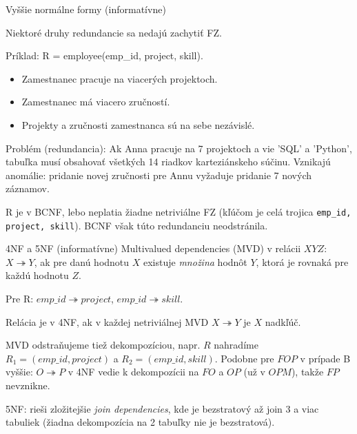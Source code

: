 \documentclass[12pt]{beamer}
\def\blue#1{\textcolor{Cerulean}{#1}}
\begin{document}
\begin{frame}[fragile]{Vyššie normálne formy (informatívne)}

Niektoré druhy redundancie sa nedajú zachytiť FZ.

Príklad: R = employee(emp\_id, project, skill).
\begin{itemize}
    \item Zamestnanec pracuje na viacerých projektoch.
    \item Zamestnanec má viacero zručností.
    \item Projekty a zručnosti zamestnanca \alert{sú na sebe nezávislé}.
\end{itemize}

Problém (redundancia): Ak Anna pracuje na 7 projektoch a vie 'SQL' a 'Python', tabuľka \alert{musí} obsahovať všetkých 14 riadkov karteziánskeho súčinu.
Vznikajú anomálie: pridanie novej zručnosti pre Annu vyžaduje pridanie 7 nových záznamov.

\medskip
R je v BCNF, lebo neplatia žiadne netriviálne FZ (kľúčom je celá trojica \texttt{emp\_id, project, skill}). BCNF však túto redundanciu neodstránila.
\end{frame}

\begin{frame}[fragile]{4NF a 5NF (informatívne)}
\alert{Multivalued dependencies} (MVD) v relácii $XYZ$:
$X \twoheadrightarrow Y$, ak pre danú hodnotu $X$ existuje \emph{množina} hodnôt $Y$, ktorá je rovnaká pre každú hodnotu $Z$.

Pre R:
$ emp\_id \twoheadrightarrow project$, $emp\_id \twoheadrightarrow skill$.

\bigskip
Relácia je v 4NF, ak v každej netriviálnej MVD $X \twoheadrightarrow Y$ je $X$ nadkľúč.

\bigskip
MVD odstraňujeme tiež dekompozíciou, napr. $R$ nahradíme $R_1 = (emp\_id, project)$ a $R_2 = (emp\_id, skill)$.
Podobne pre $FOP$ v \blue{prípade B} vyššie: $O \twoheadrightarrow P$ v 4NF vedie k dekompozícii na $FO$ a $OP$ (už v $OPM$), takže $FP$ nevznikne.
\bigskip

{\small \alert{5NF}: rieši zložitejšie \emph{join dependencies}, kde je bezstratový až join 3 a viac tabuliek (žiadna dekompozícia na 2 tabuľky nie je bezstratová).}
\end{frame}
\end{document}
